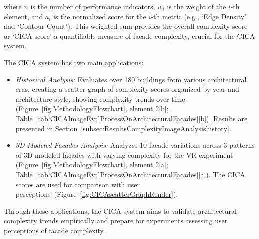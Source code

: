 where \(n\) is the number of performance indicators, \(w_i\) is the weight of the \(i\)-th element, and \(a_i\) is the normalized score for the \(i\)-th metric (e.g., `Edge Density' and `Contour Count').
This weighted sum provides the overall complexity score or `CICA score' a quantifiable measure of facade complexity, crucial for the CICA system.

The CICA system has two main applications:
\begin{itemize}
    \item \textit{Historical Analysis:} Evaluates over 180 buildings from various architectural eras, creating a scatter graph of complexity scores organized by year and architecture style, showing complexity trends over time (Figure~\ref{fig:MethodologyFlowchart}, element 2[b]; Table~\ref{tab:CICAImageEvalProcessOnArchitecturalFacades}[b]). Results are presented in Section~\ref{subsec:ResultsComplexityImageAnalysishistory}.
    \item \textit{3D-Modeled Facades Analysis:} Analyzes 10 facade variations across 3 patterns of 3D-modeled facades with varying complexity for the VR experiment (Figure~\ref{fig:MethodologyFlowchart}, element 2[a]; Table~\ref{tab:CICAImageEvalProcessOnArchitecturalFacades}[a]). The CICA scores are used for comparison with user perceptions~(Figure~\ref{fig:CICAscatterGraphRender}).
\end{itemize}

Through these applications, the CICA system aims to validate architectural complexity trends empirically and prepare for experiments assessing user perceptions of facade complexity.
